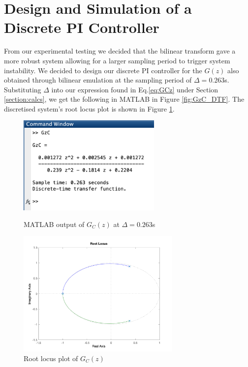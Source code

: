 \documentclass[11pt]{article}
\begin{document}
\section{Design and Simulation of a Discrete PI Controller}
From our experimental testing we decided that the bilinear transform gave a more robust system allowing for a larger sampling period to trigger system instability. We decided to design our discrete PI controller for the $G(z)$ also obtained through bilinear emulation at the sampling period of $\Delta = 0.263$s. Substituting $\Delta$ into our expression found in Eq.\ref{eq:GCz} under Section \ref{section:calcs}, we get the following in MATLAB in Figure \ref{fig:GzC_DTF}. The discretised system's root locus plot is shown in Figure \ref{fig:GzC_rlocus}.

\begin{figure}[H]
    \begin{minipage}{.5\textwidth}
    \centering
    \includegraphics[width=7cm]{W3_GzC_DTF.png}
    \caption{MATLAB output of $G_C(z)$ at $\Delta = 0.263$s}
    \label{fig:GzC_DTF}
    \end{minipage}%
    \begin{minipage}{.5\textwidth}
    \centering
    \includegraphics[width=8cm]{W3_GzC_rlocus.png}
    \caption{Root locus plot of $G_C(z)$}
    \label{fig:GzC_rlocus}
     \end{minipage}%
\end{figure}
\end{document}
